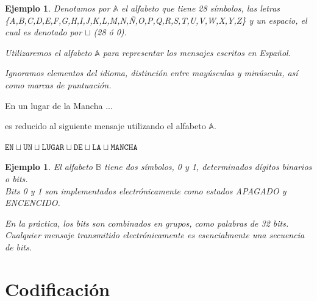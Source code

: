 \documentclass{beamer}
\newtheorem{ejemplo} [Ejemplo] {Ejemplo}
\begin{document}
\begin{frame}   
    
\begin{ejemplo}
Denotamos por $\mathbb{A}$ el alfabeto que tiene 28 símbolos, las letras \textit{\{A,B,C,D,E,F,G,H,I,J,K,L,M,N,Ñ,O,P,Q,R,S,T,U,V,W,X,Y,Z\}} y un espacio, el cual es denotado por $\sqcup$ (28 ó 0).

\vspace{0,25cm}
Utilizaremos el alfabeto $\mathbb{A}$ para representar los mensajes escritos en Español.

\vspace{0,25cm} 
Ignoramos elementos del idioma, distinción entre mayúsculas y minúscula, así como marcas de puntuación. 

\end{ejemplo}

\begin{center}
En un lugar de la Mancha ... 
\end{center}

es reducido al siguiente mensaje utilizando el alfabeto  $\mathbb{A}$.

\begin{center}
$\mathtt{EN\sqcup UN\sqcup LUGAR\sqcup DE\sqcup LA\sqcup MANCHA}$ 
\end{center}
  
 \end{frame}
 
 \begin{frame}   
 
 \begin{ejemplo}
El alfabeto $\mathbb{B}$ tiene dos símbolos, 0 y 1, determinados dígitos binarios o bits.\\
\vspace{0,25cm}
Bits 0 y 1 son implementados electrónicamente como estados APAGADO y ENCENCIDO.\\ 
\vspace{0,25cm}

En la práctica, los bits son combinados en grupos, como palabras de 32 bits.\\
\vspace{1cm}
Cualquier mensaje transmitido electrónicamente  es esencialmente una secuencia de bits.
\end{ejemplo}
  
\end{frame}



\section{Codificación}
\end{document}
